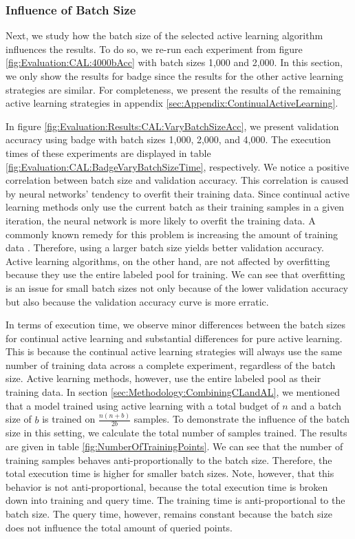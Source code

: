 \subsubsection{Influence of Batch Size}
\label{sec:Evaluation::CAL:ALRegCL:BatchSize}
Next, we study how the batch size of the selected active learning algorithm influences the results. To do so, we re-run each experiment from figure \ref{fig:Evaluation:CAL:4000bAcc}
with batch sizes 1,000 and 2,000. In this section, we only show the results for \gls{badge} since the results for the other active learning strategies are similar. For completeness, we
present the results of the remaining active learning strategies in appendix \ref{sec:Appendix:ContinualActiveLearning}. \par
In figure \ref{fig:Evaluation:Results:CAL:VaryBatchSizeAcc}, we present validation accuracy using \gls{badge} with batch sizes 1,000, 2,000, and 4,000. The execution times of these experiments
are displayed in table \ref{fig:Evaluation:CAL:BadgeVaryBatchSizeTime}, respectively. We notice a positive correlation between batch size and
validation accuracy. This correlation is caused by neural networks' tendency to overfit their training data. Since continual active learning methods only use the current batch as their training
samples in a given iteration, the neural network is more likely to overfit the training data. A commonly known remedy for this problem is increasing the amount of training data
\cite{ying2019overview}. Therefore, using a larger batch size yields better validation accuracy. Active learning algorithms, on the other hand, are not affected by overfitting because
they use the entire labeled pool for training. We can see that overfitting is an issue for small batch sizes not only because of the lower validation accuracy but also because the validation
accuracy curve is more erratic. \par
In terms of execution time, we observe minor differences between the batch sizes for continual active learning and substantial differences for pure active learning. This is because the continual
active learning strategies will always use the same number of training data across a complete experiment, regardless of the batch size. Active learning methods, however, use the entire labeled pool
as their training data. In section \ref{sec:Methodology:CombiningCLandAL}, we mentioned that a model trained using active learning with a total budget of $n$ and a batch size of $b$ is trained
on $\frac{n(n+b)}{2b}$ samples. To demonstrate the influence of the batch size in this setting, we calculate the total number of samples trained. The results are given in table 
\ref{fig:NumberOfTrainingPoints}. We can see that the number of training samples behaves anti-proportionally to the batch size. Therefore, the total execution time is higher for smaller batch sizes.
Note, however, that this behavior is not anti-proportional, because the total execution time is broken down into training and query time. The training time is anti-proportional
to the batch size. The query time, however, remains constant because the batch size does not influence the total amount of queried points. \par

